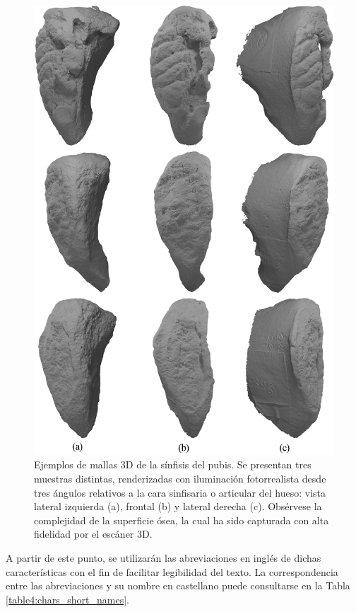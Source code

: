 \begin{figure}[htbp]
    \centering
    \includegraphics[width=0.75\linewidth]{figures/4_materials-methods/pb-examples.png}
    \caption[Ejemplos de mallas 3D de la sínfisis del pubis]{Ejemplos de mallas 3D de la sínfisis del pubis. Se presentan tres muestras distintas, renderizadas con iluminación fotorrealista desde tres ángulos relativos a la cara sinfisaria o articular del hueso: vista lateral izquierda (a), frontal (b) y lateral derecha (c). Obsérvese la complejidad de la superficie ósea, la cual ha sido capturada con alta fidelidad por el escáner 3D.}
    \label{pb_3dexamples}
\end{figure}

A partir de este punto, se utilizarán las abreviaciones en inglés de dichas características con el fin de facilitar legibilidad del texto. La correspondencia entre las abreviaciones y su nombre en castellano puede consultarse en la Tabla \ref{table4:chars_short_names}.

